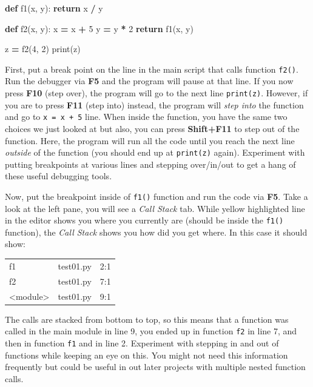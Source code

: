 \documentclass[
]{book}
\newenvironment{Shaded}{\begin{snugshade}}{\end{snugshade}}
\newcommand{\BuiltInTok}[1]{#1}
\newcommand{\ControlFlowTok}[1]{\textcolor[rgb]{0.13,0.29,0.53}{\textbf{#1}}}
\newcommand{\DecValTok}[1]{\textcolor[rgb]{0.00,0.00,0.81}{#1}}
\newcommand{\KeywordTok}[1]{\textcolor[rgb]{0.13,0.29,0.53}{\textbf{#1}}}
\newcommand{\NormalTok}[1]{#1}
\newcommand{\OperatorTok}[1]{\textcolor[rgb]{0.81,0.36,0.00}{\textbf{#1}}}
\begin{document}
\begin{Shaded}
\begin{Highlighting}[]
\KeywordTok{def}\NormalTok{ f1(x, y):}
  \ControlFlowTok{return}\NormalTok{ x }\OperatorTok{/}\NormalTok{ y}
  
\KeywordTok{def}\NormalTok{ f2(x, y):}
\NormalTok{  x }\OperatorTok{=}\NormalTok{ x }\OperatorTok{+} \DecValTok{5}
\NormalTok{  y }\OperatorTok{=}\NormalTok{ y }\OperatorTok{*} \DecValTok{2}
  \ControlFlowTok{return}\NormalTok{ f1(x, y)}
  
\NormalTok{z }\OperatorTok{=}\NormalTok{ f2(}\DecValTok{4}\NormalTok{, }\DecValTok{2}\NormalTok{)}
\BuiltInTok{print}\NormalTok{(z)}
\end{Highlighting}
\end{Shaded}

First, put a break point on the line in the main script that calls function \texttt{f2()}. Run the debugger via \textbf{F5} and the program will pause at that line. If you now press \textbf{F10} (step over), the program will go to the next line \texttt{print(z)}. However, if you are to press \textbf{F11} (step into) instead, the program will \emph{step into} the function and go to \texttt{x\ =\ x\ +\ 5} line. When inside the function, you have the same two choices we just looked at but also, you can press \textbf{Shift+F11} to step out of the function. Here, the program will run all the code until you reach the next line \emph{outside} of the function (you should end up at \texttt{print(z)} again). Experiment with putting breakpoints at various lines and stepping over/in/out to get a hang of these useful debugging tools.

Now, put the breakpoint inside of \texttt{f1()} function and run the code via \textbf{F5}. Take a look at the left pane, you will see a \emph{Call Stack} tab. While yellow highlighted line in the editor shows you where you currently are (should be inside the \texttt{f1()} function), the \emph{Call Stack} shows you how did you get where. In this case it should show:

\begin{longtable}[]{@{}lll@{}}
\toprule()
\endhead
f1 & test01.py & 2:1 \\
f2 & test01.py & 7:1 \\
\textless module\textgreater{} & test01.py & 9:1 \\
\bottomrule()
\end{longtable}

The calls are stacked from bottom to top, so this means that a function was called in the main module in line 9, you ended up in function \texttt{f2} in line 7, and then in function \texttt{f1} and in line 2. Experiment with stepping in and out of functions while keeping an eye on this. You might not need this information frequently but could be useful in out later projects with multiple nested function calls.
\end{document}

